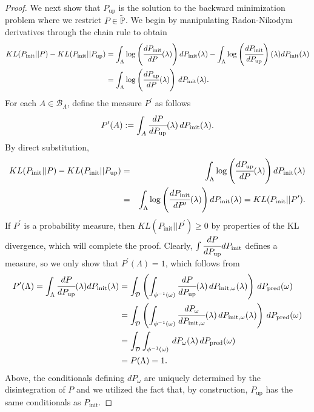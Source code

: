 \documentclass{article}
\newcommand{\p}{\mathbb{P}}
\newcommand{\B}{\mathcal{B}}
\newcommand{\pspace}{\Lambda}
\newcommand{\initmeas}{P_{\text{init}}}
\newcommand{\initmeasomega}{P_{\text{init}, \omega}}
\newcommand{\updatemeas}{P_{\text{up}}}
\newcommand{\predictmeas}{P_\text{pred}}
\begin{document}
\begin{proof}
We next show that $\updatemeas$ is the solution to the backward minimization problem where we restrict $P\in\tilde{\p}$.
We begin by manipulating Radon-Nikodym derivatives through the chain rule to obtain
\begin{align*}
KL( \initmeas || P) - KL( \initmeas || \updatemeas) &= \int_{\Lambda} \log\left(\cfrac{d\initmeas}{dP}(\lambda)\right) d\initmeas(\lambda) - \int_{\Lambda} \log\left(\cfrac{d\initmeas}{d\updatemeas}\right)(\lambda) d\initmeas(\lambda)\\
&= \int_{\Lambda} \log\left(\cfrac{d\updatemeas}{dP}(\lambda)\right) \, d\initmeas(\lambda).
\end{align*}
For each $A\in\B_\Lambda$, define the measure $P^{\prime}$ as follows %
\begin{equation}\label{eq:change_of_conditionals}
    P^{\prime}(A) := \int_A \cfrac{dP}{d\updatemeas}(\lambda) \, d\initmeas(\lambda).
\end{equation}
By direct substitution, 
\begin{eqnarray*}
    KL( \initmeas || P) - KL( \initmeas || \updatemeas) &=& \int_{\Lambda} \log\left(\cfrac{d\updatemeas}{dP}(\lambda)\right) d\initmeas(\lambda) \\
    &=& \int_{\Lambda} \log\left(\cfrac{d\initmeas}{dP^{\prime}}(\lambda)\right) d\initmeas(\lambda) = KL(P_\text{init} || P^{\prime}).
\end{eqnarray*}    
If $P^{\prime}$ is a probability measure, then $KL(P_\text{init} || P^{\prime})\geq 0$ by properties of the KL divergence, which will complete the proof. 
Clearly, $\int \cfrac{dP}{d\updatemeas} d\initmeas$ defines a measure, so we only show that $P^{\prime}(\Lambda) = 1$, which follows from 
\begin{align*}
    P^{\prime}(\Lambda) = \int_{\Lambda} \cfrac{dP}{d\updatemeas}(\lambda) d\initmeas(\lambda) &= \int_{\mathcal{D}} \left(\int_{\phi^{-1}(\omega)} \cfrac{dP}{d\updatemeas}(\lambda) \, d\initmeasomega(\lambda)\right) \, d\predictmeas(\omega) \\
    &= \int_{\mathcal{D}} \left(\int_{\phi^{-1}(\omega)} \cfrac{dP_\omega}{d\initmeasomega}(\lambda) \, d\initmeasomega(\lambda) \right)\, d\predictmeas(\omega) \\
    &= \int_{\mathcal{D}} \int_{\phi^{-1}(\omega)} \, dP_\omega(\lambda) \, d\predictmeas(\omega) \\
    &= P(\pspace) = 1.
\end{align*}
Above, the conditionals defining $dP_\omega$ are uniquely determined by the disintegration of $P$ and we utilized the fact that, by construction, $\updatemeas$ has the same conditionals as $\initmeas$. 
\end{proof}
\end{document}
